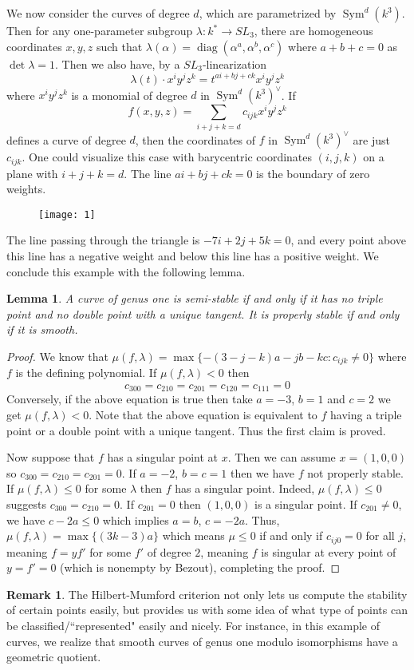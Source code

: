 \documentclass[12pt]{article}
\newtheorem{lemma}{Lemma}[section]
\theoremstyle{remark}
\theoremstyle{definition}
\newtheorem{remark}{Remark}[section]
\newcommand{\Sym}[0]{\operatorname{Sym}}
\begin{document}
    We now consider the curves of degree $d$, which are parametrized by $\Sym^d(k^3)$. Then for any one-parameter subgroup $\lambda:k^*\to SL_3$, there are homogeneous coordinates $x,y,z$ such that $\lambda(\alpha)=\operatorname{diag}(\alpha^a,\alpha^b,\alpha^c)$ where $a+b+c=0$ as $\det\lambda=1$. Then we also have, by a $SL_3$-linearization
    \[\lambda(t)\cdot x^iy^jz^k=t^{ai+bj+ck}x^iy^jz^k\]
    where $x^iy^jz^k$ is a monomial of degree $d$ in $\Sym^d(k^3)^\vee$. If 
    \[f(x,y,z)=\sum_{i+j+k=d}c_{ijk}x^iy^jz^k\]
    defines a curve of degree $d$, then the coordinates of $f$ in $\Sym^d(k^3)^\vee$ are just $c_{ijk}$. One could visualize this case with barycentric coordinates $(i,j,k)$ on a plane with $i+j+k=d$. The line $ai+bj+ck=0$ is the boundary of zero weights.
    \begin{figure}[!h]
        \centering
        \texttt{[image: 1]}
    \end{figure}
    The line passing through the triangle is $-7i+2j+5k=0$, and every point above this line has a negative weight and below this line has a positive weight. We conclude this example with the following lemma.
    \begin{lemma}
        A curve of genus one is semi-stable if and only if it has no triple point and no double point with a unique tangent. It is properly stable if and only if it is smooth.
    \end{lemma}
    \begin{proof}
        We know that $\mu(f,\lambda)=\max\{-(3-j-k)a-jb-kc:c_{ijk}\neq 0\}$ where $f$ is the defining polynomial. If $\mu(f,\lambda)<0$ then
        \[c_{300}=c_{210}=c_{201}=c_{120}=c_{111}=0\]
        Conversely, if the above equation is true then take $a=-3$, $b=1$ and $c=2$ we get $\mu(f,\lambda)<0$. Note that the above equation is equivalent to $f$ having a triple point or a double point with a unique tangent. Thus the first claim is proved.

        Now suppose that $f$ has a singular point at $x$. Then we can assume $x=(1,0,0)$ so $c_{300}=c_{210}=c_{201}=0$. If $a=-2$, $b=c=1$ then we have $f$ not properly stable. If $\mu(f,\lambda)\leqslant 0$ for some $\lambda$ then $f$ has a singular point. Indeed, $\mu(f,\lambda)\leqslant 0$ suggests $c_{300}=c_{210}=0$. If $c_{201}=0$ then $(1,0,0)$ is a singular point. If $c_{201}\neq 0$, we have $c-2a\leqslant 0$ which implies $a=b$, $c=-2a$. Thus, $\mu(f,\lambda)=\max\{(3k-3)a\}$ which means $\mu\leqslant0$ if and only if $c_{ij0}=0$ for all $j$, meaning $f=yf'$ for some $f'$ of degree $2$, meaning $f$ is singular at every point of $y=f'=0$ (which is nonempty by Bezout), completing the proof.
    \end{proof}
    \begin{remark}
        The Hilbert-Mumford criterion not only lets us compute the stability of certain points easily, but provides us with some idea of what type of points can be classified/``represented" easily and nicely. For instance, in this example of curves, we realize that smooth curves of genus one modulo isomorphisms have a geometric quotient.
    \end{remark}
    \newpage
\end{document}
